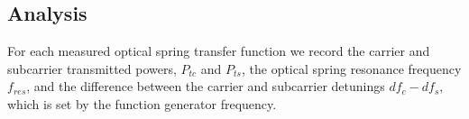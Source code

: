 %
%
%
%

\subsection{Analysis}

For each measured optical spring transfer function we record the carrier and subcarrier transmitted powers, $P_{tc}$ and $P_{ts}$, the optical spring resonance frequency $f_{res}$, and the difference between the carrier and subcarrier detunings $df_c-df_s$, which is set by the function generator frequency.   


